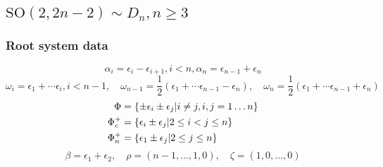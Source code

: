 
\subsection[SO(2,2n-2)]{$\mathrm{SO}(2,2n-2) \sim D_n, n\geq 3$}

\subsubsection{Root system data}

\[\alpha_i = \epsilon_i - \epsilon_{i+1}, i<n, \alpha_n = \epsilon_{n-1} + \epsilon_n\]
\[\omega_i = \epsilon_1+\cdots \epsilon_i, i < n-1, \quad \omega_{n-1} = \frac{1}{2}(\epsilon_1 + \cdots \epsilon_{n-1}-\epsilon_n), \quad \omega_{n} = \frac{1}{2}(\epsilon_1 + \cdots \epsilon_{n-1}+\epsilon_n)\]
\begin{align*}
 \Phi &= \{ \pm \epsilon_i \pm \epsilon_j | i\neq j, i,j = 1\ldots n \} \\
 \Phi_c^+ &= \{ \epsilon_i\pm \epsilon_j | 2\leq i < j \leq  n\}\\
 \Phi_n^+ &= \{ \epsilon_1 \pm \epsilon_j | 2 \leq  j \leq n \}
 \end{align*}
\[\beta = \epsilon_1+\epsilon_2,\quad \rho = (n-1,\ldots ,1,0),\quad \zeta = (1,0,\ldots,0)\]

